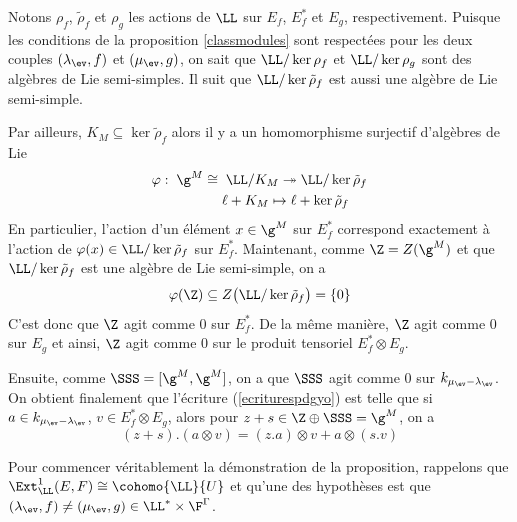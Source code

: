 \begin{Prop}
\begin{pre}
Notons $\rho_f$, $\tilde{\rho}_f$ et $\rho_g$ les actions de $\LL$ sur $E_f$, $E_f^*$ et $E_g$, respectivement. Puisque les conditions de la proposition \ref{classmodules} sont respectées pour les deux couples $(\lambda_{\ev},f)$ et $(\mu_{\ev},g)$, on sait que $\LL/\ker \rho_f$ et $\LL/\ker \rho_g$ sont des algèbres de Lie semi-simples. Il suit que $\LL/\ker \tilde{\rho}_f$ est aussi une algèbre de Lie semi-simple. 

Par ailleurs, $K_M \subseteq \ker \tilde{\rho}_f$ alors il y a un homomorphisme surjectif d'algèbres de Lie 
\begin{align*}
\varphi : \; \g^M \cong \;&\; \LL/K_M \twoheadrightarrow \LL / \ker \tilde{\rho}_f\\
&\ell + K_M  \mapsto \ell + \ker \tilde{\rho}_f
\end{align*}
En particulier, l'action d'un élément $x \in \g^M$ sur $E_f^*$ correspond exactement à l'action de $\varphi(x) \in \LL / \ker \tilde{\rho}_f$ sur $E_f^*$. Maintenant, comme $\Z = Z(\g^M)$ et que $\LL / \ker \tilde{\rho}_f$ est une algèbre de Lie semi-simple, on a 
$$ \varphi(\Z) \subseteq Z\big(\LL / \ker \tilde{\rho}_f\big) = \{0\} $$
C'est donc que $\Z$ agit comme 0 sur $E_f^*$. De la même manière, $\Z$ agit comme 0 sur $E_g$ et ainsi, $\Z$ agit comme 0 sur le produit tensoriel $E_f^* \otimes E_g$.

Ensuite, comme $\SSS = [\g^M,\g^M]$, on a que $\SSS$ agit comme 0 sur $k_{\mu_{\ev} - \lambda_{\ev}}$. On obtient finalement que l'écriture (\ref{ecriturespdgyo}) est telle que si $a \in k_{\mu_{\ev} - \lambda_{\ev}}$, $v \in E_f^* \otimes E_g$, alors pour $z + s \in \Z \oplus \SSS = \g^M$, on a
\begin{equation} \label{actionmaprop}
(z+s).(a \otimes v) = (z.a) \otimes v + a \otimes (s.v)
\end{equation}


Pour commencer véritablement la démonstration de la proposition, rappelons que \linebreak $\Ext_\LL^1(E,F) \cong \cohomo{\LL}{U}$ et qu'une des hypothèses est que $(\lambda_{\ev},f) \neq (\mu_{\ev},g) \in \LL^* \times \F^\Gamma$. 


\end{pre}
\end{Prop}
